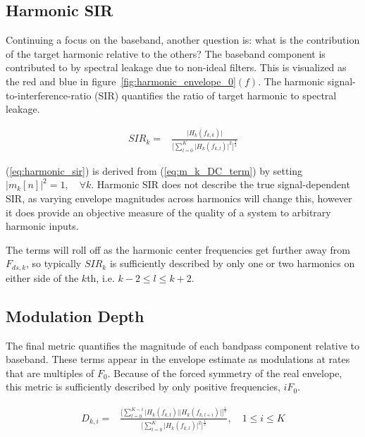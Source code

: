 \documentclass [11pt, proquest,oneside] {ganter_thesis}[2015/03/03]
\begin{document}
\subsection{Harmonic SIR}

Continuing a focus on the baseband, another question is: what is the contribution of the target harmonic relative to the others?  The baseband component is contributed to by spectral leakage due to non-ideal filters.  This is visualized as the red and blue in figure~\ref{fig:harmonic_envelope_0}$(f)$.  The harmonic signal-to-interference-ratio (SIR) quantifies the ratio of target harmonic to spectral leakage.

\begin{align}
\label{eq:harmonic_sir}
SIR_k =& \frac{\Big| H_k(f_{k,k}) \Big|} {\Bigg[ \sum\limits_{l=0}^K \Big|H_k(f_{k,l})\Big|^2 \Bigg] ^ \frac{1}{2}}
\end{align}

(\ref{eq:harmonic_sir}) is derived from (\ref{eq:m_k_DC_term}) by setting $\Big|m_k[n]\Big|^2 = 1, \quad \forall k$.  Harmonic SIR does not describe the true signal-dependent SIR, as varying envelope magnitudes across harmonics will change this, however it does provide an objective measure of the quality of a system to arbitrary harmonic inputs.

The terms will roll off as the harmonic center frequencies get further away from $F_{ds,k}$, so typically $SIR_k$ is sufficiently described by only one or two harmonics on either side of the $k$th, i.e. $k-2 \leq l \leq k+2$.



\subsection{Modulation Depth}

The final metric quantifies the magnitude of each bandpass component relative to baseband.  These terms appear in the envelope estimate as modulations at rates that are multiples of $F_0$.  Because of the forced symmetry of the real envelope, this metric is sufficiently described by only positive frequencies, $iF_0$.

\begin{align}
\label{eq:modulation_depth}
D_{k,i} =& \frac{\Bigg[ \sum\limits_{l=0}^{K-i} \Big|H_k(f_{k,l})\Big| \Big|H_k(f_{k,l+i})\Big|\Bigg]^\frac{1}{2}}
{\Bigg[ \sum\limits_{l=0}^K \Big|H_k(f_{k,l})\Big|^2 \Bigg] ^ \frac{1}{2}}, \quad 1 \leq i \leq K
\end{align}
\end{document}
